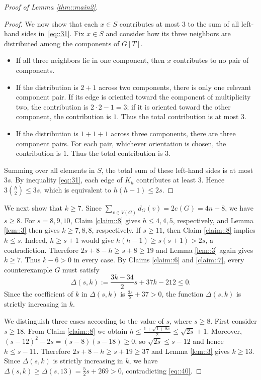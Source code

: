 \documentclass[11pt]{article}
\theoremstyle{definition}
\begin{document}
\begin{proof}[Proof of Lemma \ref{thm::main2}]
\begin{proof}
    We now show that each $x\in S$ contributes at most $3$ to the sum of all left-hand sides in~\eqref{eq::31}. Fix $x\in S$ and consider how its three neighbors are distributed among the components of $G[T]$.
    \begin{itemize}
      \item If all three neighbors lie in one component, then $x$ contributes to no pair of components.
      \item If the distribution is $2+1$ across two components, there is only one relevant component pair. If its edge is oriented toward the component of multiplicity two, the contribution is $2\cdot2-1=3$; if it is oriented toward the other component, the contribution is $1$. Thus the total contribution is at most $3$.
      \item If the distribution is $1+1+1$ across three components, there are three component pairs. For each pair, whichever orientation is chosen, the contribution is $1$. Thus the total contribution is $3$.
    \end{itemize}
    Summing over all elements in $S$, the total sum of these left-hand sides is at most $3s$. By inequality \eqref{eq::31}, each edge of $K_h$ contributes at least $3$. Hence $3\binom h2\le3s$, which is equivalent to $h(h-1)\le2s$.
  \end{proof}










  We next show that $k\geq 7$. Since $\sum_{v\in V(G)}d_G(v)=2e(G)=4n-8$, we have $s\geq 8$. For $s=8,9,10$, Claim \ref{claim::8} gives $h\leq 4,4,5$, respectively, and  Lemma \ref{lem::3} then gives $k\geq 7,8,8$, respectively. If $s\geq 11$, then Claim \ref{claim::8} implies $h\leq s$. Indeed, $h\geq s+1$ would give $h(h-1)\geq s(s+1)>2s$, a contradiction. Therefore $2s+8-h\geq s+8\geq 19$ and  Lemma \ref{lem::3} again gives $k\geq 7$. Thus $k-6>0$ in every case. By Claims \ref{claim::6} and \ref{claim::7}, every counterexample $G$ must satisfy
  \begin{equation}\label{eq::40}
    \Delta(s,k):= \frac{3k-34}{2}s+37k-212\leq 0.
  \end{equation}
  Since the coefficient of $k$ in $\Delta(s,k)$ is $\frac{3s}{2}+37>0$, the function $\Delta(s,k)$ is strictly increasing in $k$.

  We distinguish three cases according to the value of $s$, where $s\geq 8$. First consider $s\geq 18$. From Claim \ref{claim::8} we obtain $h\leq \frac{1+\sqrt{1+8s}}{2} \leq \sqrt{2s}+1$. Moreover, $(s-12)^2-2s=(s-8)(s-18)\geq 0$, so $\sqrt{2s}\leq s-12$ and hence $h\leq s-11$. Therefore $2s+8-h\geq s+19\geq 37$ and Lemma \ref{lem::3} gives $k\geq 13$. Since $\Delta(s,k)$ is strictly increasing in $k$, we have $\Delta(s,k)\geq\Delta(s,13)=\frac{5}{2}s+269>0$, contradicting \eqref{eq::40}.



\end{proof}
\end{document}
